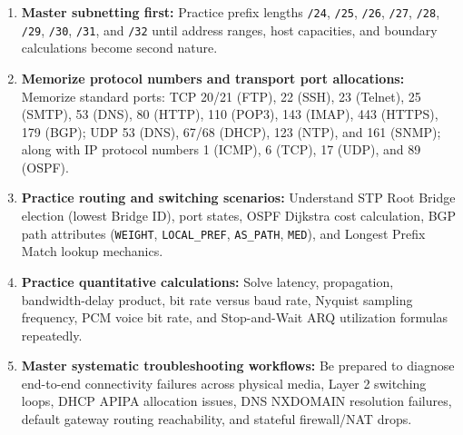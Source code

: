 \begin{enumerate}
    \item \textbf{Master subnetting first:} Practice prefix lengths \texttt{/24}, \texttt{/25}, \texttt{/26}, \texttt{/27}, \texttt{/28}, \texttt{/29}, \texttt{/30}, \texttt{/31}, and \texttt{/32} until address ranges, host capacities, and boundary calculations become second nature.
    \item \textbf{Memorize protocol numbers and transport port allocations:} Memorize standard ports: TCP 20/21 (FTP), 22 (SSH), 23 (Telnet), 25 (SMTP), 53 (DNS), 80 (HTTP), 110 (POP3), 143 (IMAP), 443 (HTTPS), 179 (BGP); UDP 53 (DNS), 67/68 (DHCP), 123 (NTP), and 161 (SNMP); along with IP protocol numbers 1 (ICMP), 6 (TCP), 17 (UDP), and 89 (OSPF).
    \item \textbf{Practice routing and switching scenarios:} Understand STP Root Bridge election (lowest Bridge ID), port states, OSPF Dijkstra cost calculation, BGP path attributes (\texttt{WEIGHT}, \texttt{LOCAL\_PREF}, \texttt{AS\_PATH}, \texttt{MED}), and Longest Prefix Match lookup mechanics.
    \item \textbf{Practice quantitative calculations:} Solve latency, propagation, bandwidth-delay product, bit rate versus baud rate, Nyquist sampling frequency, PCM voice bit rate, and Stop-and-Wait ARQ utilization formulas repeatedly.
    \item \textbf{Master systematic troubleshooting workflows:} Be prepared to diagnose end-to-end connectivity failures across physical media, Layer 2 switching loops, DHCP APIPA allocation issues, DNS NXDOMAIN resolution failures, default gateway routing reachability, and stateful firewall/NAT drops.
\end{enumerate}

